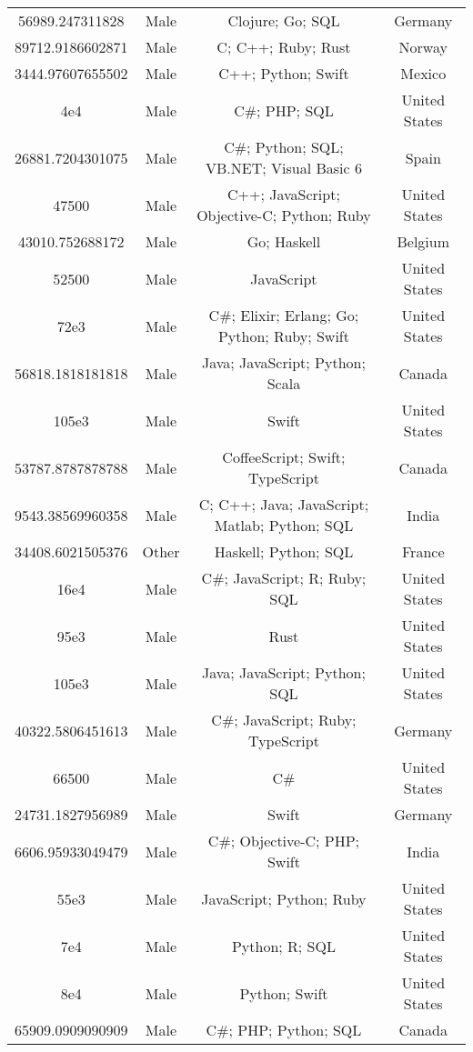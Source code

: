 \begin{center}
\begin{tabular}{ |c|c|c|c| }
56989.247311828  &  Male  &  Clojure; Go; SQL  &  Germany  \\ 
89712.9186602871  &  Male  &  C; C++; Ruby; Rust  &  Norway  \\ 
3444.97607655502  &  Male  &  C++; Python; Swift  &  Mexico  \\ 
4e4  &  Male  &  C\#; PHP; SQL  &  United States  \\ 
26881.7204301075  &  Male  &  C\#; Python; SQL; VB.NET; Visual Basic 6  &  Spain  \\ 
47500  &  Male  &  C++; JavaScript; Objective-C; Python; Ruby  &  United States  \\ 
43010.752688172  &  Male  &  Go; Haskell  &  Belgium  \\ 
52500  &  Male  &  JavaScript  &  United States  \\ 
72e3  &  Male  &  C\#; Elixir; Erlang; Go; Python; Ruby; Swift  &  United States  \\ 
56818.1818181818  &  Male  &  Java; JavaScript; Python; Scala  &  Canada  \\ 
105e3  &  Male  &  Swift  &  United States  \\ 
53787.8787878788  &  Male  &  CoffeeScript; Swift; TypeScript  &  Canada  \\ 
9543.38569960358  &  Male  &  C; C++; Java; JavaScript; Matlab; Python; SQL  &  India  \\ 
34408.6021505376  &  Other  &  Haskell; Python; SQL  &  France  \\ 
16e4  &  Male  &  C\#; JavaScript; R; Ruby; SQL  &  United States  \\ 
95e3  &  Male  &  Rust  &  United States  \\ 
105e3  &  Male  &  Java; JavaScript; Python; SQL  &  United States  \\ 
40322.5806451613  &  Male  &  C\#; JavaScript; Ruby; TypeScript  &  Germany  \\ 
66500  &  Male  &  C\#  &  United States  \\ 
24731.1827956989  &  Male  &  Swift  &  Germany  \\ 
6606.95933049479  &  Male  &  C\#; Objective-C; PHP; Swift  &  India  \\ 
55e3  &  Male  &  JavaScript; Python; Ruby  &  United States  \\ 
7e4  &  Male  &  Python; R; SQL  &  United States  \\ 
8e4  &  Male  &  Python; Swift  &  United States  \\ 
65909.0909090909  &  Male  &  C\#; PHP; Python; SQL  &  Canada  \\ 

\end{tabular}
\end{center}
